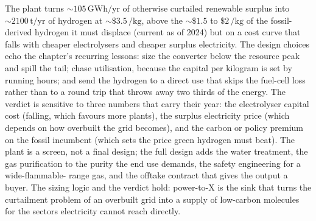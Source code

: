 The plant turns $\sim 105\,\si{\giga\watt\hour}/\text{yr}$ of otherwise
curtailed renewable surplus into $\sim 2100\,\text{t}/\text{yr}$ of
hydrogen at $\sim \$3.5\,\si{\per\kilogram}$, above the $\sim \$1.5$ to
$\$2\,\si{\per\kilogram}$ of the fossil-derived hydrogen it must displace
(current as of 2024) but on a cost curve that falls with cheaper
electrolysers and cheaper surplus electricity. The design choices echo the
chapter's recurring lessons: size the converter below the resource peak and
spill the tail; chase utilisation, because the capital per kilogram is set
by running hours; and send the hydrogen to a direct use that skips the
fuel-cell loss rather than to a round trip that throws away two thirds of
the energy. The verdict is sensitive to three numbers that carry their
year: the electrolyser capital cost (falling, which favours more plants),
the surplus electricity price (which depends on how overbuilt the grid
becomes), and the carbon or policy premium on the fossil incumbent (which
sets the price green hydrogen must beat). The plant is a screen, not a final
design; the full design adds the water treatment, the gas purification to
the purity the end use demands, the safety engineering for a wide-flammable-
range gas, and the offtake contract that gives the output a buyer. The
sizing logic and the verdict hold: power-to-X is the sink that turns the
curtailment problem of an overbuilt grid into a supply of low-carbon
molecules for the sectors electricity cannot reach directly.

